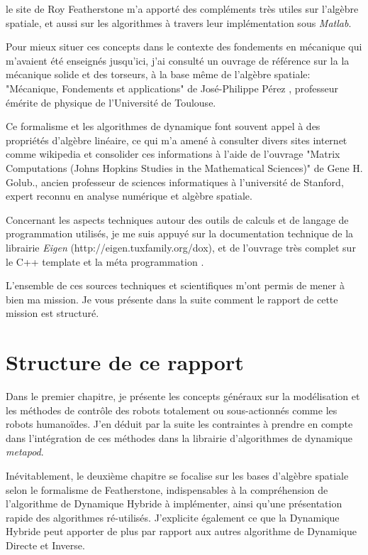 \documentclass{report}
\begin{document}
\noindent
le site de Roy Featherstone \cite{bib_featherstoneSite} m'a apporté des compléments très utiles sur l'algèbre spatiale, et aussi sur les algorithmes à travers leur implémentation sous \emph{Matlab}.

Pour mieux situer ces concepts dans le contexte des fondements en mécanique qui m'avaient été enseignés jusqu'ici, j'ai consulté un ouvrage de référence sur la la mécanique solide et des torseurs, à la base même de l'algèbre spatiale: "Mécanique, Fondements et applications" de José-Philippe Pérez \cite{bib_champVecteurs}, professeur émérite de physique de l’Université de Toulouse.

Ce formalisme et les algorithmes de dynamique font souvent appel à des propriétés d'algèbre linéaire, ce qui m'a amené à consulter divers sites internet comme wikipedia et consolider ces informations à l'aide de l'ouvrage "Matrix Computations (Johns Hopkins Studies in the Mathematical Sciences)" de Gene H. Golub., ancien professeur de sciences informatiques à l'université de Stanford, expert reconnu en analyse numérique et algèbre spatiale.

Concernant les aspects techniques autour des outils de calculs et de langage de programmation utilisés, je me suis appuyé sur la documentation technique de la librairie \emph{Eigen} (http://eigen.tuxfamily.org/dox), et de l'ouvrage très complet sur le C++ template et la méta programmation \cite{bib_metaprogramming}.

L'ensemble de ces sources techniques et scientifiques m'ont permis de mener à bien ma mission. Je vous présente dans la suite comment le rapport de cette mission est structuré.

\section*{Structure de ce rapport}
Dans le premier chapitre, je présente les concepts généraux sur la modélisation et les méthodes de contrôle des robots totalement ou sous-actionnés comme les robots humanoïdes. J'en déduit par la suite les contraintes à prendre en compte dans l'intégration de ces méthodes dans la librairie d'algorithmes de dynamique \emph{metapod}.

Inévitablement, le deuxième chapitre se focalise sur les bases d'algèbre spatiale selon le formalisme de Featherstone, indispensables à la compréhension de l'algorithme de Dynamique Hybride à implémenter, ainsi qu'une présentation rapide des algorithmes ré-utilisés. J'explicite également ce que la Dynamique Hybride peut apporter de plus par rapport aux autres algorithme de Dynamique Directe et Inverse.
\end{document}
